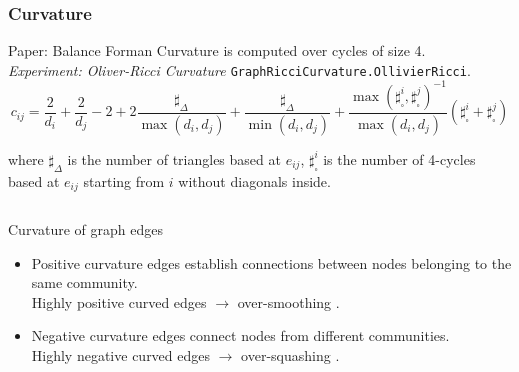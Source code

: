 \documentclass[10pt, aspectratio = 169]{beamer}
\begin{document}
\begin{frame}
    \frametitle{Curvature}
    \label{curvature}
    \small
    Paper: Balance Forman Curvature \cite[Topping, 2022]{topping2022understandingoversquashingbottlenecksgraphs} is computed over cycles of size 4.\\
    \emph{Experiment: Oliver-Ricci Curvature \cite[Ni, 2015]{ni2015riccicurvatureinternettopology}} {\scriptsize
    \texttt{GraphRicciCurvature.OllivierRicci}.
    }\\
    $$c_{ij}= \frac{2}{d_i} + \frac{2}{d_j} - 2 + 2 \frac{\sharp_{\Delta}}{\max(d_i, d_j)} + 
            \frac{\sharp_{\Delta}}{\min(d_i, d_j)} + 
            \frac{\max(\sharp_{\square}^i,\sharp_{\square}^j)^{-1}}{\max(d_i, d_j)}
            (\sharp_{\square}^i + \sharp_{\square}^j)
    $$

    {\tiny
    where $\sharp_{\Delta}$ is the number of triangles based at $e_{ij}$, 
    $\sharp_{\square}^i$ is the number of 4-cycles based at $e_{ij}$ starting from $i$
    without diagonals inside.
    }

    \begin{columns}
        \begin{column}{0.6\textwidth}
            \begin{block} {Curvature of graph edges}           
            \begin{itemize}
                \small
                \item Positive curvature edges establish connections between 
                nodes belonging to the same community.
                \\Highly positive curved edges $\rightarrow$ over-smoothing \cite[Nguyen et al., 2023]{nguyen2023revisiting}.
                
                \item Negative curvature edges connect nodes from different communities.
                \\Highly negative curved edges $\rightarrow$ over-squashing \cite[Topping et al., 2021]{topping2022understandingoversquashingbottlenecksgraphs}.
            \end{itemize}
        \end{block}


\end{column}
\end{columns}
\end{frame}
\end{document}

